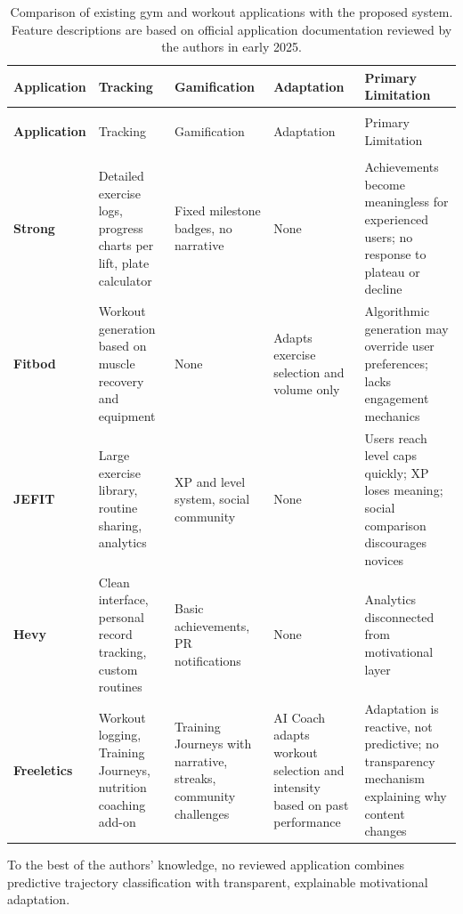 \documentclass[12pt, a4paper]{report}
\begin{document}
\begin{longtable}{>{\bfseries}p{2.2cm} p{2.5cm} p{2.5cm} p{2.5cm} p{2.5cm}}
  \caption{Comparison of existing gym and workout applications with the proposed system. Feature descriptions are based on official application documentation reviewed by the authors in early 2025.}
  \label{tab:app-comparison}\\
  \toprule
  Application & Tracking & Gamification & Adaptation & Primary Limitation \\
  \midrule
  \endfirsthead
  \multicolumn{5}{c}{\textit{(Table \ref{tab:app-comparison} continued)}}\\
  \toprule
  Application & Tracking & Gamification & Adaptation & Primary Limitation \\
  \midrule
  \endhead
  \midrule
  \multicolumn{5}{r}{\textit{Continued on next page\ldots}}\\
  \endfoot
  \bottomrule
  \endlastfoot
  Strong & Detailed exercise logs, progress charts per lift, plate calculator & Fixed milestone badges, no narrative & None & Achievements become meaningless for experienced users; no response to plateau or decline \\
  \addlinespace
  Fitbod & Workout generation based on muscle recovery and equipment & None & Adapts exercise selection and volume only & Algorithmic generation may override user preferences; lacks engagement mechanics \\
  \addlinespace
  JEFIT & Large exercise library, routine sharing, analytics & XP and level system, social community & None & Users reach level caps quickly; XP loses meaning; social comparison discourages novices \\
  \addlinespace
  Hevy & Clean interface, personal record tracking, custom routines & Basic achievements, PR notifications & None & Analytics disconnected from motivational layer \\
  \addlinespace
  Freeletics & Workout logging, Training Journeys, nutrition coaching add-on & Training Journeys with narrative, streaks, community challenges & AI Coach adapts workout selection and intensity based on past performance & Adaptation is reactive, not predictive; no transparency mechanism explaining why content changes \\
\end{longtable}

To the best of the authors' knowledge, no reviewed application combines predictive trajectory classification with transparent, explainable motivational adaptation.
\end{document}
